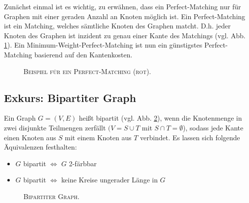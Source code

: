 Zunächst einmal ist es wichtig, zu erwähnen, dass ein Perfect-Matching nur für Graphen mit einer geraden Anzahl an Knoten möglich ist.
Ein Perfect-Matching ist ein Matching, welches sämtliche Knoten des Graphen matcht.
D.h. jeder Knoten des Graphen ist inzident zu genau einer Kante des Matchings (vgl. Abb. \ref{fig:perfect_matching}).
Ein Minimum-Weight-Perfect-Matching ist nun ein günstigstes Perfect-Matching basierend auf den Kantenkosten.
\begin{figure}[H]
\centering
{}
\caption{\textsc{Beispiel für ein Perfect-Matching (rot).}}
\label{fig:perfect_matching}
\end{figure}

\subsection{Exkurs: Bipartiter Graph}
\label{sec:digression_bipartite_graph}

Ein Graph $G = (V, E)$ heißt bipartit (vgl. Abb. \ref{fig:bipartite_graph}), wenn die Knotenmenge in zwei disjunkte Teilmengen zerfällt
$(V = S \cup T$ mit $S \cap T = \emptyset$), sodass jede Kante einen Knoten aus $S$ mit einem Knoten aus $T$ verbindet. \cite{HochschuleDarmstadt}\newline
Es lassen sich folgende Äquivalenzen festhalten:
\begin{itemize}
  \item $G$ bipartit $\iff$ $G$ 2-färbbar
  \item $G$ bipartit $\iff$ keine Kreise ungerader Länge in $G$
\end{itemize}

\begin{figure}[H]
\centering
{}
\caption{\textsc{Bipartiter Graph.}}
\label{fig:bipartite_graph}
\end{figure}

